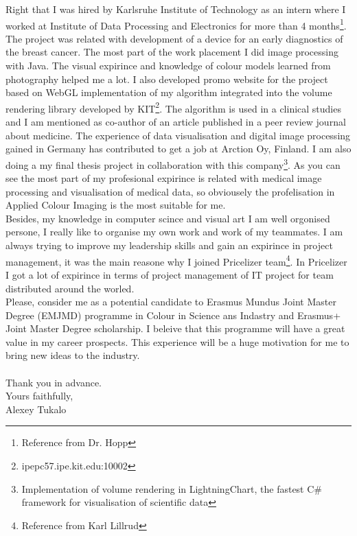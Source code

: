 \documentclass[english]{article}
\begin{document}
Right that I was hired by Karlsruhe Institute of Technology as an intern where I worked at Institute of Data Processing and Electronics for more than 4 months\footnote{Reference from Dr. Hopp}. The project was related with development of a device for an early diagnostics of the breast cancer. The most part of the work placement I did image processing with Java. The visual expirince and knowledge of colour models learned from photography helped me a lot. I also developed promo website for the project based on WebGL implementation of my algorithm integrated into the volume rendering library developed by KIT\footnote{ipepc57.ipe.kit.edu:10002}. The algorithm is used in a clinical studies and I am mentioned as co-author of an article published in a peer review journal about medicine. The experience of data visualisation and digital image processing gained in Germany has contributed to get a job at Arction Oy, Finland. I am also doing a my final thesis project in collaboration with this company\footnote{Implementation of volume rendering in LightningChart, the fastest C\# framework for visualisation of scientific data}. As you can see the most part of my profesional expirince is related with medical image processing and visualisation of medical data, so obviousely the profelisation in Applied Colour Imaging is the most suitable for me.\\

Besides, my knowledge in computer scince and visual art I am well orgonised persone, I really like to organise my own work and work of my teammates. I am always trying to improve my leadership skills and gain an expirince in project management, it was the main reasone why I joined Pricelizer team\footnote{Reference from Karl Lillrud}. In Pricelizer I got a lot of expirince in terms of project management of IT project for team distributed around the worled.\\

Please, consider me as a potential candidate to Erasmus Mundus Joint Master Degree (EMJMD) programme in Colour in Science ans Indastry and Erasmus+ Joint Master Degree scholarship. I beleive that this programme will have a great value in my career prospects. This experience will be a huge motivation for me to bring new ideas to the industry. \\\\


Thank you in advance.\\
Yours faithfully,\\
Alexey Tukalo
    
\end{document}
